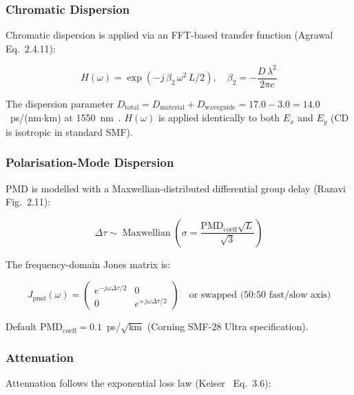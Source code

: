 \documentclass[3p,times,preprint]{elsarticle}
\begin{document}
\subsubsection{Chromatic Dispersion}

Chromatic dispersion is applied via an FFT-based transfer function
(Agrawal~\cite{agrawal5} Eq.~2.4.11):

\begin{equation}
  H(\omega) = \exp\!\left(-j\,\beta_2\,\omega^2\,L/2\right),
  \quad
  \beta_2 = -\frac{D\,\lambda^2}{2\pi c}
  \label{eq:cd}
\end{equation}

The dispersion parameter $D_{\text{total}} = D_{\text{material}} +
D_{\text{waveguide}} = 17.0 - 3.0 = 14.0$~ps/(nm$\cdot$km)
at 1550~nm~\cite{hui,keck}.  $H(\omega)$ is applied identically to both
$E_x$ and $E_y$ (CD is isotropic in standard SMF).

\subsubsection{Polarisation-Mode Dispersion}

PMD is modelled with a Maxwellian-distributed differential group delay
(Razavi~\cite{razavi} Fig.~2.11):

\begin{equation}
  \Delta\tau \sim \operatorname{Maxwellian}\!\left(\sigma =
    \frac{\text{PMD}_{\text{coeff}}\sqrt{L}}{\sqrt{3}}\right)
\end{equation}

The frequency-domain Jones matrix is:

\begin{equation}
  J_{\text{pmd}}(\omega) = \begin{pmatrix}
    e^{-j\omega\Delta\tau/2} & 0 \\
    0 & e^{+j\omega\Delta\tau/2}
  \end{pmatrix}
  \quad\text{or swapped (50:50 fast/slow axis)}
  \label{eq:pmd}
\end{equation}

Default $\text{PMD}_{\text{coeff}} = 0.1$~ps/$\sqrt{\text{km}}$
(Corning SMF-28 Ultra specification).

\subsubsection{Attenuation}

Attenuation follows the exponential loss law (Keiser~\cite{keiser} Eq.~3.6):
\end{document}
